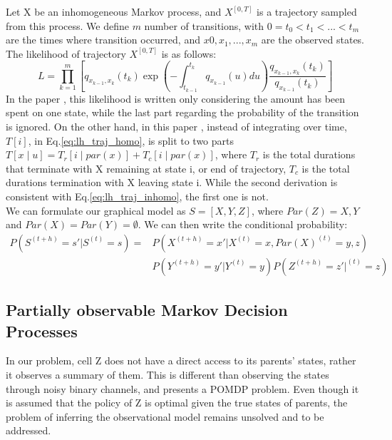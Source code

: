 \documentclass[]{article}
\begin{document}
	Let X be an inhomogeneous Markov process, and $  X^{\left[0,T\right] } $ is a trajectory sampled from this process. We define $ m $ number of transitions, with $ 0 = t_{0} < t_{1} < ... < t_{m} $ are the times where transition occurred, and $ x{0}, x_{1},...,x_{m} $ are the observed states. The likelihood of trajectory  $  X^{\left[0,T\right] } $ is  as follows: 
	\begin{equation}
	L= \prod_{k=1}^{m} \left[ q_{x_{k-1}, x_{k}} (t_{k}) \exp \left(-\int_{t_{k-1}}^{t_{k}} q_{x_{k-1}}(u) d u\right) \frac{q_{x_{k-1}, x_{k}} (t_{k})}{q_{x_{k-1}}(t_{k})}\right] 
	\label{eq:lh_traj_inhomo}
	\end{equation}
	In the paper \cite{Perez-Ocon2000}, this likelihood is written only considering the amount has been spent on one state, while the last part regarding the probability of the transition is ignored. On the other hand, in this paper \cite{Nodelman2014}, instead of integrating over time, $ T[i] $, in Eq.\ref{eq:lh_traj_homo}, is split to two parts $ T[x\mid u] = T_{r}[i\mid par(x)] + T_{c}[i\mid par(x)] $, where $ T_{r}  $ is the total durations that terminate with X remaining at state i, or end of trajectory, $ T_{c} $ is the total durations termination with X leaving state i. While the second derivation is consistent with Eq.\ref{eq:lh_traj_inhomo}, the first one is not.\\
	
	We can formulate our graphical model as $ S = [X, Y, Z] $, where $ Par(Z) = {X,Y} $ and $ Par(X) = Par(Y) =\emptyset $. We can then write the conditional probability:
	\begin{equation}
	\begin{split}
	P\left(S^{\left(t+h\right)}=s' | S^{\left(t\right)}=s\right) = & P\left(X^{\left( t+h\right) }=x' | X^{\left(t\right)}=x, Par(X)^{\left(t\right)}={y,z}\right) \\&  P\left(Y^{\left( t+h\right) }=y' | Y^{\left(t\right)}=y\right) P\left(Z^{\left( t+h\right) }=z' | ^{\left(t\right)}=z\right)
	\end{split} 
	\end{equation}
	
	\subsection{Partially observable Markov Decision Processes}
	In our problem, cell Z does not have a direct access to its parents' states, rather it observes a summary of them. This is different than observing the states through noisy binary channels, and presents a POMDP problem. Even though it is assumed that the policy of Z is optimal given the true states of parents, the problem of inferring the observational model remains unsolved and to be addressed.
	
\end{document}
